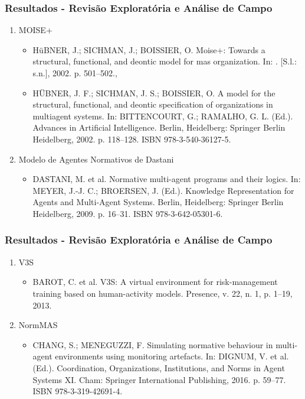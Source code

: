 \documentclass{beamer}
\begin{document}
\begin{frame}
	\frametitle{Resultados - Revisão Exploratória e Análise de Campo}
 	\begin{enumerate}
		\item MOISE+
		\begin{itemize}
		 	\item HüBNER, J.; SICHMAN, J.; BOISSIER, O. Moise+: Towards a structural, functional, and deontic model for mas organization. In: . [S.l.: s.n.], 2002. p. 501–502., 
			\item HÜBNER, J. F.; SICHMAN, J. S.; BOISSIER, O. A model for the structural, functional, and deontic specification of organizations in multiagent systems. In: BITTENCOURT, G.; RAMALHO, G. L. (Ed.). Advances in Artificial Intelligence. Berlin, Heidelberg: Springer Berlin Heidelberg, 2002. p. 118–128. ISBN 978-3-540-36127-5.
		\end{itemize}
		\item Modelo de Agentes Normativos de Dastani
		\begin{itemize}
			\item DASTANI, M. et al. Normative multi-agent programs and their logics. In: MEYER, J.-J. C.; BROERSEN, J. (Ed.). Knowledge Representation for Agents and Multi-Agent Systems. Berlin, Heidelberg: Springer Berlin Heidelberg, 2009. p. 16–31. ISBN 978-3-642-05301-6.
		\end{itemize}
	\end{enumerate}
\end{frame}

\begin{frame}
	\frametitle{Resultados - Revisão Exploratória e Análise de Campo}
 	\begin{enumerate}
		\item V3S
		\begin{itemize}
			\item BAROT, C. et al. V3S: A virtual environment for risk-management training based on human-activity models. Presence, v. 22, n. 1, p. 1–19, 2013.
		\end{itemize}
		\item NormMAS
		\begin{itemize}
			\item CHANG, S.; MENEGUZZI, F. Simulating normative behaviour in multi-agent environments using monitoring artefacts. In: DIGNUM, V. et al. (Ed.). Coordination, Organizations, Institutions, and Norms in Agent Systems XI. Cham: Springer International Publishing, 2016. p. 59–77. ISBN 978-3-319-42691-4.
		\end{itemize}

	\end{enumerate}
\end{frame}
\end{document}
